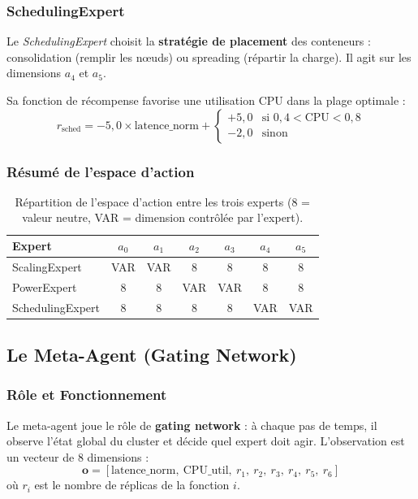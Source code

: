 \subsubsection{SchedulingExpert}

Le \textit{SchedulingExpert} choisit la \textbf{stratégie de placement}
des conteneurs : consolidation (remplir les nœuds) ou spreading (répartir
la charge). Il agit sur les dimensions $a_4$ et $a_5$.

Sa fonction de récompense favorise une utilisation CPU dans la plage optimale :
\[
r_{\text{sched}} = -5{,}0 \times \text{latence\_norm}
+ \begin{cases} +5{,}0 & \text{si } 0{,}4 < \text{CPU} < 0{,}8 \\ -2{,}0 & \text{sinon} \end{cases}
\]

\subsubsection{Résumé de l'espace d'action}

\begin{table}[h]
\centering
\begin{tabular}{|l|c|c|c|c|c|c|}
\hline
\textbf{Expert} & $a_0$ & $a_1$ & $a_2$ & $a_3$ & $a_4$ & $a_5$ \\
\hline
ScalingExpert   & VAR & VAR & 8 & 8 & 8 & 8 \\
PowerExpert     & 8 & 8 & VAR & VAR & 8 & 8 \\
SchedulingExpert & 8 & 8 & 8 & 8 & VAR & VAR \\
\hline
\end{tabular}
\caption{Répartition de l'espace d'action entre les trois experts
(8 = valeur neutre, VAR = dimension contrôlée par l'expert).}
\label{tab:action_space}
\end{table}

\subsection{Le Meta-Agent (Gating Network)}

\subsubsection{Rôle et Fonctionnement}

Le meta-agent joue le rôle de \textbf{gating network} : à chaque pas de
temps, il observe l'état global du cluster et décide quel expert doit agir.
L'observation est un vecteur de 8 dimensions :
\[
\mathbf{o} = [\text{latence\_norm},\ \text{CPU\_util},\ r_1,\ r_2,\ r_3,\ r_4,\ r_5,\ r_6]
\]
où $r_i$ est le nombre de réplicas de la fonction $i$.

